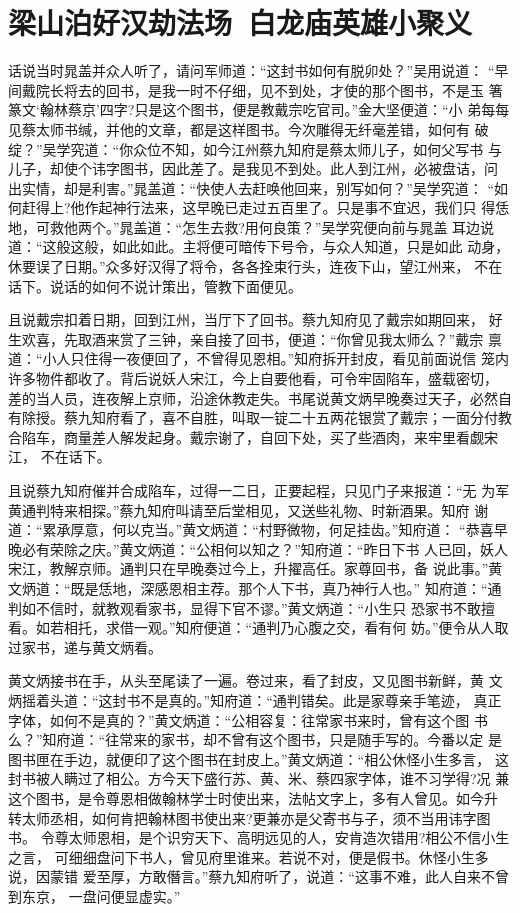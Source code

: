 \chapter{梁山泊好汉劫法场~白龙庙英雄小聚义}

话说当时晁盖并众人听了，请问军师道：“这封书如何有脱卯处？”吴用说道：
“早间戴院长将去的回书，是我一时不仔细，见不到处，才使的那个图书，不是玉
箸篆文‘翰林蔡京’四字?只是这个图书，便是教戴宗吃官司。”金大坚便道：“小
弟每每见蔡太师书缄，并他的文章，都是这样图书。今次雕得无纤毫差错，如何有
破绽？”吴学究道：“你众位不知，如今江州蔡九知府是蔡太师儿子，如何父写书
与儿子，却使个讳字图书，因此差了。是我见不到处。此人到江州，必被盘诘，问
出实情，却是利害。”晁盖道：“快使人去赶唤他回来，别写如何？”吴学究道：
“如何赶得上?他作起神行法来，这早晚已走过五百里了。只是事不宜迟，我们只
得恁地，可救他两个。”晁盖道：“怎生去救?用何良策？”吴学究便向前与晁盖
耳边说道：“这般这般，如此如此。主将便可暗传下号令，与众人知道，只是如此
动身，休要误了日期。”众多好汉得了将令，各各拴束行头，连夜下山，望江州来，
不在话下。说话的如何不说计策出，管教下面便见。

且说戴宗扣着日期，回到江州，当厅下了回书。蔡九知府见了戴宗如期回来，
好生欢喜，先取酒来赏了三钟，亲自接了回书，便道：“你曾见我太师么？”戴宗
禀道：“小人只住得一夜便回了，不曾得见恩相。”知府拆开封皮，看见前面说信
笼内许多物件都收了。背后说妖人宋江，今上自要他看，可令牢固陷车，盛载密切，
差的当人员，连夜解上京师，沿途休教走失。书尾说黄文炳早晚奏过天子，必然自
有除授。蔡九知府看了，喜不自胜，叫取一锭二十五两花银赏了戴宗；一面分付教
合陷车，商量差人解发起身。戴宗谢了，自回下处，买了些酒肉，来牢里看觑宋江，
不在话下。

且说蔡九知府催并合成陷车，过得一二日，正要起程，只见门子来报道：“无
为军黄通判特来相探。”蔡九知府叫请至后堂相见，又送些礼物、时新酒果。知府
谢道：“累承厚意，何以克当。”黄文炳道：“村野微物，何足挂齿。”知府道：
“恭喜早晚必有荣除之庆。”黄文炳道：“公相何以知之？”知府道：“昨日下书
人已回，妖人宋江，教解京师。通判只在早晚奏过今上，升擢高任。家尊回书，备
说此事。”黄文炳道：“既是恁地，深感恩相主荐。那个人下书，真乃神行人也。”
知府道：“通判如不信时，就教观看家书，显得下官不谬。”黄文炳道：“小生只
恐家书不敢擅看。如若相托，求借一观。”知府便道：“通判乃心腹之交，看有何
妨。”便令从人取过家书，递与黄文炳看。

黄文炳接书在手，从头至尾读了一遍。卷过来，看了封皮，又见图书新鲜，黄
文炳摇着头道：“这封书不是真的。”知府道：“通判错矣。此是家尊亲手笔迹，
真正字体，如何不是真的？”黄文炳道：“公相容复：往常家书来时，曾有这个图
书么？”知府道：“往常来的家书，却不曾有这个图书，只是随手写的。今番以定
是图书匣在手边，就便印了这个图书在封皮上。”黄文炳道：“相公休怪小生多言，
这封书被人瞒过了相公。方今天下盛行苏、黄、米、蔡四家字体，谁不习学得?况
兼这个图书，是令尊恩相做翰林学士时使出来，法帖文字上，多有人曾见。如今升
转太师丞相，如何肯把翰林图书使出来?更兼亦是父寄书与子，须不当用讳字图书。
令尊太师恩相，是个识穷天下、高明远见的人，安肯造次错用?相公不信小生之言，
可细细盘问下书人，曾见府里谁来。若说不对，便是假书。休怪小生多说，因蒙错
爱至厚，方敢僭言。”蔡九知府听了，说道：“这事不难，此人自来不曾到东京，
一盘问便显虚实。”

